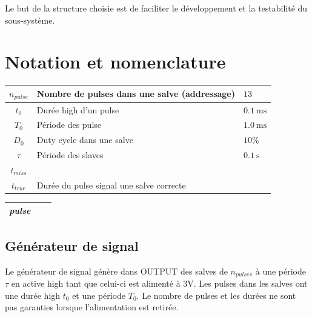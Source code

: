 \documentclass[french]{layout/Report}
\begin{document}
Le but de la structure choisie est de faciliter le développement et la testabilité
du sous-système.



\section{Notation et nomenclature}

\begin{center}
	\begin{tabular}{| c | l | l |}
		\hline
		$n_{pulse}$	& Nombre de pulses dans une salve (addressage) & $13$ \\ \hline
		$t_0$				& Durée high d'un pulse	& $\SI{0.1}{\milli\second}$	\\ \hline
		$T_0$				& Période des pulse	& $\SI{1.0}{\milli\second}$	\\ \hline
		$D_0$				& Duty cycle dans une salve & $10\%$	\\ \hline
		$\tau$			& Période des slaves	& $\SI{0.1}{\second}$\\ \hline
		$t_{miss}$  & &\\ \hline
		$t_{true}$  & Durée du pulse signal une salve correcte & \\ \hline
	\end{tabular}
\end{center}

\begin{center}
    \begin{tabular}{| c | l | c |}
			\hline
        \textit{pulse}      &  \\ \hline
    \end{tabular}
\end{center}

\subsection{Générateur de signal}
Le générateur de signal génère dans OUTPUT des salves de $n_{pulses}$ à une période $\tau$ en active high tant que celui-ci est alimenté à 3V. Les pulses dans les salves ont une durée high $t_0$ et une période $T_0$. Le nombre de pulses et les durées ne sont pas garanties lorsque l'alimentation est retirée.
\end{document}
